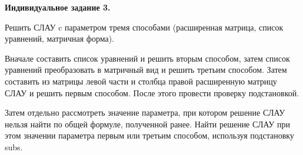 \documentclass[11pt]{report}
\begin{document}
\pagestyle{empty}

{\bf Индивидуальное задание 3.}


Решить СЛАУ c параметром тремя способами (расширенная матрица, список уравнений, матричная форма).
 
Вначале составить список уравнений и решить вторым способом, 
затем список уравнений преобразовать в матричный вид и решить третьим способом. 
Затем составить из матрицы левой части и столбца правой расширенную матрицу СЛАУ и решить первым способом. 
После этого провести проверку подстановкой.

Затем отдельно рассмотреть значение параметра, при котором решение СЛАУ нельзя найти по общей формуле, 
полученной ранее. 
Найти решение СЛАУ при этом значении параметра первым или третьим способом, используя подстановку subs.
\end{document}
